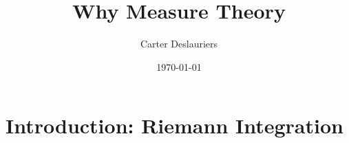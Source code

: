\documentclass[12pt]{article}
\title{Why Measure Theory}
\author{Carter Deslauriers}
\date{\today}
\makeatletter
\theoremstyle{plain}
\theoremstyle{definition}
\theoremstyle{definition}
\theoremstyle{remark}
\renewenvironment{proof}[1][\proofname]{\par
\pushQED{\qed}\normalfont\topsep6\p@\@plus6\p@\relax
\trivlist\item[\hskip\labelsep\small\itshape #1\@addpunct{.}]\ignorespaces\mbox{}\\
}{\popQED\endtrivlist\@endpefalse}
\makeatother
\begin{document}
\maketitle

\section{Introduction: Riemann Integration}

\end{document}
